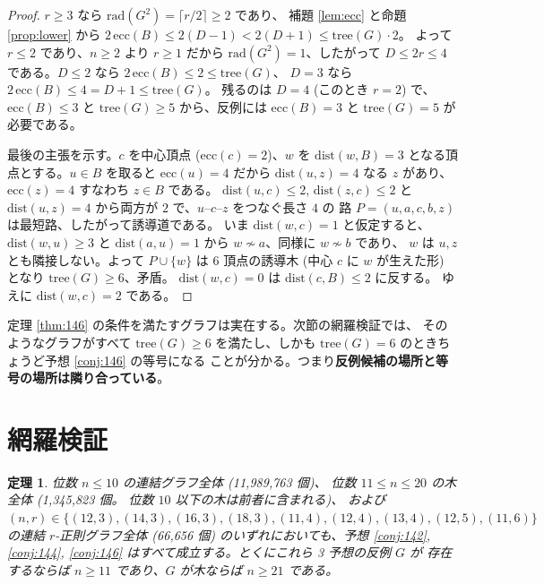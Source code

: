 \documentclass[paper=a4,fontsize=10.5pt,jafontsize=10.5pt]{jlreq}
\theoremstyle{plain}
\newtheorem{theorem}{定理}[section]
\theoremstyle{definition}
\begin{document}
\begin{proof}
$r \ge 3$ なら $\mathrm{rad}(G^2) = \lceil r/2 \rceil \ge 2$ であり、
補題 \ref{lem:ecc} と命題 \ref{prop:lower} から
$2\,\mathrm{ecc}(B) \le 2(D-1) < 2(D+1) \le \mathrm{tree}(G)\cdot 2$。
よって $r \le 2$ であり、$n \ge 2$ より $r \ge 1$ だから
$\mathrm{rad}(G^2) = 1$、したがって $D \le 2r \le 4$ である。$D \le 2$ なら
$2\,\mathrm{ecc}(B) \le 2 \le \mathrm{tree}(G)$、
$D = 3$ なら $2\,\mathrm{ecc}(B) \le 4 = D+1 \le \mathrm{tree}(G)$。
残るのは $D = 4$ (このとき $r = 2$) で、$\mathrm{ecc}(B) \le 3$ と
$\mathrm{tree}(G) \ge 5$ から、反例には
$\mathrm{ecc}(B) = 3$ と $\mathrm{tree}(G) = 5$ が必要である。

最後の主張を示す。$c$ を中心頂点 ($\mathrm{ecc}(c) = 2$)、$w$ を
$\mathrm{dist}(w, B) = 3$ となる頂点とする。$u \in B$ を取ると
$\mathrm{ecc}(u) = 4$ だから $\mathrm{dist}(u, z) = 4$ なる $z$ があり、
$\mathrm{ecc}(z) = 4$ すなわち $z \in B$ である。
$\mathrm{dist}(u,c) \le 2$, $\mathrm{dist}(z,c) \le 2$ と
$\mathrm{dist}(u,z) = 4$ から両方が $2$ で、$u$--$c$--$z$ をつなぐ長さ $4$ の
路 $P = (u, a, c, b, z)$ は最短路、したがって誘導道である。
いま $\mathrm{dist}(w, c) = 1$ と仮定すると、$\mathrm{dist}(w,u) \ge 3$ と
$\mathrm{dist}(a,u) = 1$ から $w \not\sim a$、同様に $w \not\sim b$ であり、
$w$ は $u, z$ とも隣接しない。よって $P \cup \{w\}$ は $6$ 頂点の誘導木
(中心 $c$ に $w$ が生えた形) となり $\mathrm{tree}(G) \ge 6$、矛盾。
$\mathrm{dist}(w,c) = 0$ は $\mathrm{dist}(c, B) \le 2$ に反する。
ゆえに $\mathrm{dist}(w, c) = 2$ である。
\end{proof}

定理 \ref{thm:146} の条件を満たすグラフは実在する。次節の網羅検証では、
そのようなグラフがすべて $\mathrm{tree}(G) \ge 6$ を満たし、しかも
$\mathrm{tree}(G) = 6$ のときちょうど予想 \ref{conj:146} の等号になる
ことが分かる。つまり\textbf{反例候補の場所と等号の場所は隣り合っている}。

\section{網羅検証}

\begin{theorem}\label{thm:main}
位数 $n \le 10$ の連結グラフ全体 (11,989,763 個)、
位数 $11 \le n \le 20$ の木全体 (1,345,823 個。
位数 $10$ 以下の木は前者に含まれる)、
および $(n, r) \in \{(12, 3), (14, 3), (16, 3), (18, 3), (11, 4), (12, 4), (13, 4), (12, 5), (11, 6)\}$ の連結 $r$-正則グラフ全体
(66,656 個) のいずれにおいても、予想 \ref{conj:142}, \ref{conj:144},
\ref{conj:146} はすべて成立する。とくにこれら 3 予想の反例 $G$ が
存在するならば $n \ge 11$ であり、$G$ が木ならば
$n \ge 21$ である。
\end{theorem}
\end{document}

